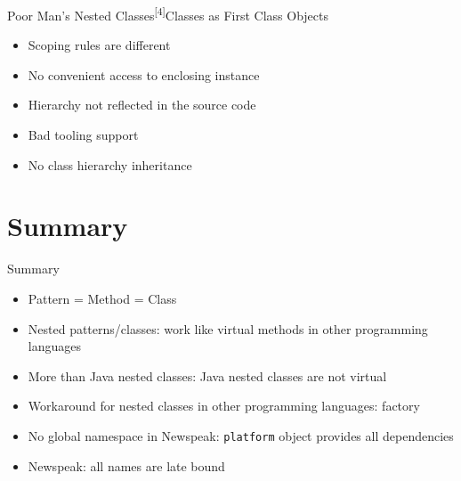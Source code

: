 \documentclass[xcolor=dvipsname,handout]{beamer} %
\begin{document}
\begin{frame}{Poor Man's Nested Classes\textsuperscript{[4]}}{Classes as First Class Objects}
\begin{itemize}
  \item Scoping rules are different
  \item No convenient access to enclosing instance
  \item Hierarchy not reflected in the source code
  \item Bad tooling support
  \item No class hierarchy inheritance
\end{itemize}
\end{frame}

%
%

\section{Summary}
\begin{frame}{Summary}
\begin{itemize}
  \item Pattern = Method = Class
  \item Nested patterns/classes: work like virtual methods in other programming languages
  \item More than Java nested classes: Java nested classes are not virtual
  \item Workaround for nested classes in other programming languages: factory
  \item No global namespace in Newspeak: \lstinline{platform} object provides all dependencies
  \item Newspeak: all names are late bound
\end{itemize}
\end{frame}
\end{document}

